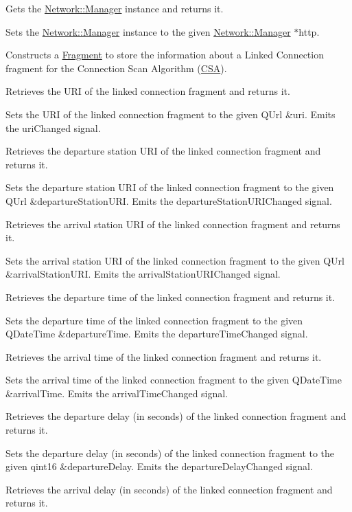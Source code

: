 Gets the \mbox{\hyperlink{classNetwork_1_1Manager}{Network\+::\+Manager}} instance and returns it.

Sets the \mbox{\hyperlink{classNetwork_1_1Manager}{Network\+::\+Manager}} instance to the given \mbox{\hyperlink{classNetwork_1_1Manager}{Network\+::\+Manager}} $\ast$http.

Constructs a \mbox{\hyperlink{classFragments_1_1Fragment}{Fragment}} to store the information about a Linked Connection fragment for the Connection Scan Algorithm (\mbox{\hyperlink{namespaceCSA}{C\+SA}}).

Retrieves the U\+RI of the linked connection fragment and returns it.

Sets the U\+RI of the linked connection fragment to the given Q\+Url \&uri. Emits the uri\+Changed signal.

Retrieves the departure station U\+RI of the linked connection fragment and returns it.

Sets the departure station U\+RI of the linked connection fragment to the given Q\+Url \&departure\+Station\+U\+RI. Emits the departure\+Station\+U\+R\+I\+Changed signal.

Retrieves the arrival station U\+RI of the linked connection fragment and returns it.

Sets the arrival station U\+RI of the linked connection fragment to the given Q\+Url \&arrival\+Station\+U\+RI. Emits the arrival\+Station\+U\+R\+I\+Changed signal.

Retrieves the departure time of the linked connection fragment and returns it.

Sets the departure time of the linked connection fragment to the given Q\+Date\+Time \&departure\+Time. Emits the departure\+Time\+Changed signal.

Retrieves the arrival time of the linked connection fragment and returns it.

Sets the arrival time of the linked connection fragment to the given Q\+Date\+Time \&arrival\+Time. Emits the arrival\+Time\+Changed signal.

Retrieves the departure delay (in seconds) of the linked connection fragment and returns it.

Sets the departure delay (in seconds) of the linked connection fragment to the given qint16 \&departure\+Delay. Emits the departure\+Delay\+Changed signal.

Retrieves the arrival delay (in seconds) of the linked connection fragment and returns it.

